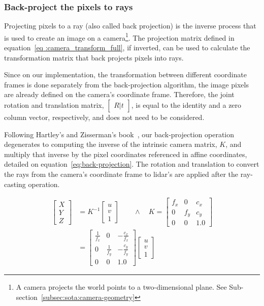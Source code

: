 \subsubsection{Back-project the pixels to rays}
Projecting pixels to a ray (also called back projection) is the inverse process that is used to create an image on a camera\footnote{A camera projects the world points to a two-dimensional plane. See Sub-section~\ref{subsec:sota:camera-geometry}}. The projection matrix defined in equation~\ref{eq :camera_transform_full}, if inverted, can be used to calculate the transformation matrix that  back projects pixels into rays.

Since on our implementation, the transformation between different coordinate frames is done separately from the back-projection algorithm, the image pixels are already defined on the camera's coordinate frame. Therefore, the joint rotation and translation matrix, $\begin{bmatrix} R|t \end{bmatrix}$, is equal to the identity and a zero column vector, respectively, and does not need to be considered.

Following Hartley's and Zisserman's book~\cite{mvg_book}, our back-projection operation degenerates to computing the inverse of the intrinsic camera matrix, $K$, and multiply that inverse by the pixel coordinates referenced in affine coordinates, detailed on equation~\ref{eq:back-projection}. The rotation and translation to convert the rays from the camera's coordinate frame to \ac{lidar}'s are applied after the ray-casting operation.

\begin{align}
	\label{eq:back-projection}
	\begin{bmatrix}
		X \\
		Y \\
		Z
	\end{bmatrix}
	 & = K^{-1} 
	\begin{bmatrix}
		u \\
		v \\
		1
	\end{bmatrix}
\qquad \wedge \quad
	K = 
	\begin{bmatrix}
		f_x & 0 & c_x \\
		0 & f_y & c_y \\
		0 & 0 & 1.0
	\end{bmatrix}
\nonumber \\	 
	&  = 
	\begin{bmatrix}
	\frac{1}{f_x} & 0 & -\frac{c_x}{f_x} \\
	0 & \frac{1}{f_y}  & -\frac{c_y}{f_y} \\
	0 & 0 & 1.0 
	\end{bmatrix}
	\begin{bmatrix}
		u \\
		v \\
		1
	\end{bmatrix}
\end{align}

